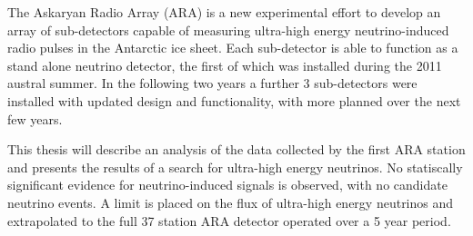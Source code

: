 The Askaryan Radio Array (ARA) is a new experimental effort to develop an array of sub-detectors capable of measuring ultra-high energy neutrino-induced radio pulses in the Antarctic ice sheet. Each sub-detector is able to function as a stand alone neutrino detector, the first of which was installed during the 2011 austral summer. In the following two years a further 3 sub-detectors were installed with updated design and functionality, with more planned over the next few years.

This thesis will describe an analysis of the data collected by the first ARA station and presents the results of a search for ultra-high energy neutrinos. No statiscally significant evidence for neutrino-induced signals is observed, with no candidate neutrino events. A limit is placed on the flux of ultra-high energy neutrinos and extrapolated to the full 37 station ARA detector operated over a 5 year period.

